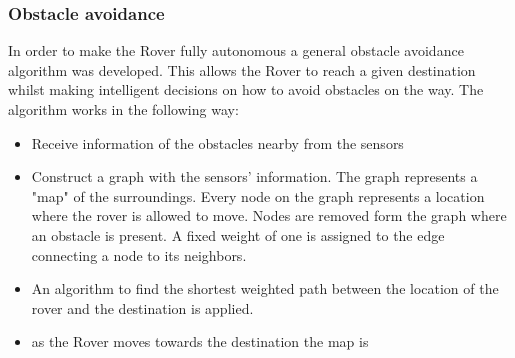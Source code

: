 \documentclass[10pt,twoside]{article}
\begin{document}
\subsubsection{Obstacle avoidance}
In order to make the Rover fully autonomous a general obstacle avoidance algorithm was developed. This allows the Rover to reach a given destination whilst making intelligent decisions on how to avoid obstacles on the way.
The algorithm works in the following way:
\begin{itemize}
    \item Receive information of the obstacles nearby from the sensors
    \item Construct a graph with the sensors' information. The graph represents a "map" of the surroundings. Every node on the graph represents a location where the rover is allowed to move. Nodes are removed form the graph where an obstacle is present. A fixed weight of one is assigned to the edge connecting a node to its neighbors.
    \item An algorithm to find the shortest weighted path between the location of the rover and the destination is applied.
    \item as the Rover moves towards the destination the map is
\end{itemize}
\end{document}
